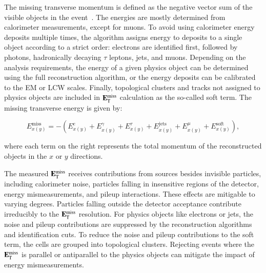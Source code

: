 The missing transverse momentum is defined as the negative vector sum of the visible objects in the event~\cite{TheATLASCollaboration:2012jy,TheATLASCollaboration:2013ua}. The energies are mostly determined from calorimeter measurements, except for muons. To avoid using calorimeter energy deposits multiple times, the algorithm assigns energy to deposits to a single object according to a strict order: electrons are identified first, followed by photons, hadronically decaying $\tau$ leptons, jets, and muons. Depending on the analysis requirements, the energy of a given physics object can be determined using the full reconstruction algorithm, or the energy deposits can be calibrated to the EM or LCW scales. Finally, topological clusters and tracks not assigned to physics objects are included in $\mathbf{E}_{\mathrm{T}}^{\mathrm{miss}}$ calculation as the so-called soft term. The missing transverse energy is given by:

\begin{equation}\label{eqn:reco-met}
	E_{x(y)}^{\mathrm{miss}} = -\left(E_{x(y)}^{e} + E_{x(y)}^{\gamma} + E_{x(y)}^{\tau} + E_{x(y)}^{\mathrm{jets}} + E_{x(y)}^{\mu} + E_{x(y)}^{\mathrm{soft}}\right),
\end{equation}

where each term on the right represents the total momentum of the reconstructed objects in the $x$ or $y$ directions.

The measured $\mathbf{E}_{\mathrm{T}}^{\mathrm{miss}}$ receives contributions from sources besides invisible particles, including calorimeter noise, particles falling in insensitive regions of the detector, energy mismeasurements, and pileup interactions. These effects are mitigable to varying degrees. Particles falling outside the detector acceptance contribute irreducibly to the $\mathbf{E}_{\mathrm{T}}^{\mathrm{miss}}$ resolution. For physics objects like electrons or jets, the noise and pileup contributions are suppressed by the reconstruction algorithms and identification cuts. To reduce the noise and pileup contributions to the soft term, the cells are grouped into topological clusters. Rejecting events where the $\mathbf{E}_{\mathrm{T}}^{\mathrm{miss}}$ is parallel or antiparallel to the physics objects can mitigate the impact of energy mismeasurements. 


